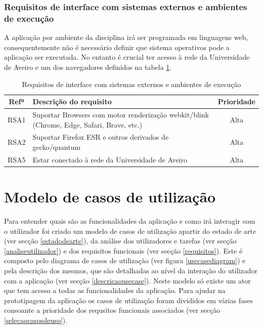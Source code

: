 \documentclass[11pt, twoside]{report}
\begin{document}
	\subsection{Requisitos de interface com sistemas externos e ambientes de execução}
	
	A aplicação por ambiente da disciplina irá ser programada em linguagens web,
	consequentemente não é necessário definir que sistema operativos pode a aplicação ser executada.
	No entanto é crucial ter acesso à rede da Universidade de Aveiro e um dos navegadores definidos na tabela \ref{requisitosdesistemas}.
	
	\def\arraystretch{1.5}
	\begin{table}[H]
		\caption{Requisitos de interface com sistemas externos e ambientes de execução}
		\begin{center}
			\begin{tabularx}{\textwidth}{|c|X|c|}
				\hline
				\textbf{Refª }	& \textbf{Descrição do requisito} & \textbf{Prioridade}\\
				\hline
				RSA1 & Suportar Browsers com motor renderização webkit/blink (Chrome, Edge, Safari, Brave, etc.)  & Alta \\
				\hline
				RSA2 & Suportar Firefox ESR e outros derivados de gecko/quantum & Alta \\
				\hline
				RSA5 & Estar conectado à rede da Universidade de Aveiro & Alta\\
				\hline
			\end{tabularx}
			\label{requisitosdesistemas}
		\end{center}
	\end{table}
		
	
	\chapter{Modelo de casos de utilização}
	
	
	Para entender quais são as funcionalidades da aplicação e como irá interagir com o utilizador foi criado um modelo de casos de utilização apartir do estado de arte (ver secção \ref{estadodearte}), da análise dos utilizadores e tarefas  (ver secção \ref{analiseutilizador}) e dos requisitos funcionais (ver secção \ref{requisitos}). Este é composto pelo diagrama de casos de utilização (ver figura \ref{usecasediagram}) e pela descrição dos mesmos, que são detalhadas ao nível da interação do utilizador com a aplicação (ver secção \ref{descricaousecase}). Neste modelo só existe um ator que tem acesso a todas as funcionalidades da aplicação. 
	Para ajudar na prototipagem da aplicação os casos de utilização foram divididos em várias fases consoante a prioridade dos requsitos funcionais associados (ver secção \ref{selecaocasosdeuso}).
	
\end{document}
